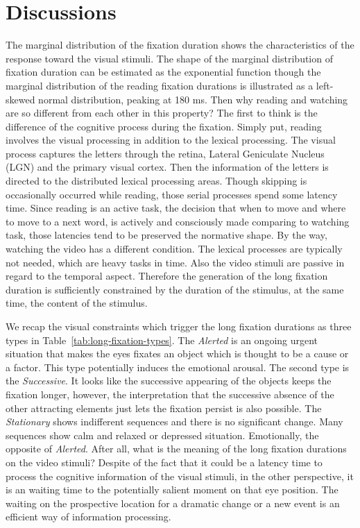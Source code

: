 \documentclass[oneside,master]{snueethesis}
\begin{document}
\chapter{Discussions}

The marginal distribution of the fixation duration shows the characteristics of the response toward the visual stimuli. The shape of the marginal distribution of fixation duration can be estimated as the exponential function though the marginal distribution of the reading fixation durations is illustrated as a left-skewed normal distribution, peaking at 180 ms. Then why reading and watching are so different from each other in this property? The first to think is the difference of the cognitive process during the fixation. Simply put, reading involves the visual processing in addition to the lexical processing. The visual process captures the letters through the retina, Lateral Geniculate Nucleus (LGN) and the primary visual cortex. Then the information of the letters is directed to the distributed lexical processing areas. Though skipping is occasionally occurred while reading, those serial processes spend some latency time. Since reading is an active task, the decision that when to move and where to move to a next word, is actively and consciously made comparing to watching task, those latencies tend to be preserved the normative shape. By the way, watching the video has a different condition. The lexical processes are typically not needed, which are heavy tasks in time. Also the video stimuli are passive in regard to the temporal aspect. Therefore the generation of the long fixation duration is sufficiently constrained by the duration of the stimulus, at the same time, the content of the stimulus. 

We recap the visual constraints which trigger the long fixation durations as three types in Table~\ref{tab:long-fixation-types}. The \textit{Alerted} is an ongoing urgent situation that makes the eyes fixates an object which is thought to be a cause or a factor. This type potentially induces the emotional arousal. The second type is the \textit{Successive}. It looks like the successive appearing of the objects keeps the fixation longer, however, the interpretation that the successive absence of the other attracting elements just lets the fixation persist is also possible. The \textit{Stationary} shows indifferent sequences and there is no significant change. Many sequences show calm and relaxed or depressed situation. Emotionally, the opposite of \textit{Alerted}. After all, what is the meaning of the long fixation durations on the video stimuli? Despite of the fact that it could be a latency time to process the cognitive information of the visual stimuli, in the other perspective, it is an waiting time to the potentially salient moment on that eye position. The waiting on the prospective location for a dramatic change or a new event is an efficient way of information processing.
\end{document}
